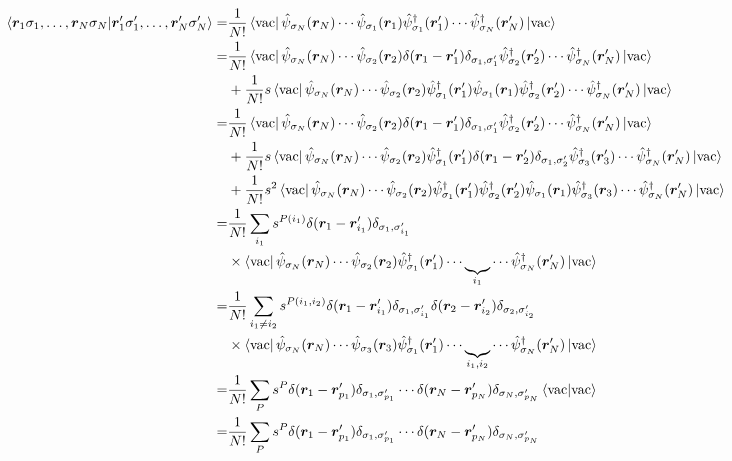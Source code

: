 \documentclass{ltjsarticle}
\begin{document}
\begin{align}
  \braket{\bm{r}_1\sigma_1,\dots,\bm{r}_N\sigma_N}{\bm{r}'_1\sigma'_1,\dots,\bm{r}'_{N}\sigma'_{N}}
  =&\frac{1}{N!} \bra{\rm{vac}}\hat{\psi}_{\sigma_N}(\bm{r}_N)\cdots\hat{\psi}_{\sigma_1}(\bm{r}_1)\hat{\psi}_{\sigma_1}^\dag (\bm{r}'_1)\cdots\hat{\psi}_{\sigma_N}^\dag (\bm{r}'_N)\ket{\rm{vac}}\\
  =&\frac{1}{N!}\bra{\rm{vac}}\hat{\psi}_{\sigma_N}(\bm{r}_N)\cdots\hat{\psi}_{\sigma_2}(\bm{r}_2)\delta(\bm{r}_1-\bm{r}'_{1})\delta_{\sigma_1,\sigma'_{1}}\hat{\psi}_{\sigma_2}^\dag (\bm{r}'_2)\cdots\hat{\psi}_{\sigma_N}^\dag (\bm{r}'_N)\ket{\rm{vac}}\\
  &+\frac{1}{N!}s\bra{\rm{vac}}\hat{\psi}_{\sigma_N}(\bm{r}_N)\cdots\hat{\psi}_{\sigma_2}(\bm{r}_2)\hat{\psi}_{\sigma_1}^\dag (\bm{r}'_1)\hat{\psi}_{\sigma_1}(\bm{r}_1)\hat{\psi}_{\sigma_2}^\dag (\bm{r}'_2)\cdots\hat{\psi}_{\sigma_N}^\dag (\bm{r}'_N)\ket{\rm{vac}}\\
  =&\frac{1}{N!}\bra{\rm{vac}}\hat{\psi}_{\sigma_N}(\bm{r}_N)\cdots\hat{\psi}_{\sigma_2}(\bm{r}_2)\delta(\bm{r}_1-\bm{r}'_{1})\delta_{\sigma_1,\sigma'_{1}}\hat{\psi}_{\sigma_2}^\dag (\bm{r}'_2)\cdots\hat{\psi}_{\sigma_N}^\dag (\bm{r}'_N)\ket{\rm{vac}}\\
  &+\frac{1}{N!}s\bra{\rm{vac}}\hat{\psi}_{\sigma_N}(\bm{r}_N)\cdots\hat{\psi}_{\sigma_2}(\bm{r}_2)\hat{\psi}_{\sigma_1}^\dag (\bm{r}'_1)\delta(\bm{r}_1-\bm{r}'_{2})\delta_{\sigma_1,\sigma'_{2}}\hat{\psi}_{\sigma_3}^\dag (\bm{r}'_3)\cdots\hat{\psi}_{\sigma_N}^\dag (\bm{r}'_N)\ket{\rm{vac}}\\
  &+\frac{1}{N!}s^2\bra{\rm{vac}}\hat{\psi}_{\sigma_N}(\bm{r}_N)\cdots\hat{\psi}_{\sigma_2}(\bm{r}_2)\hat{\psi}_{\sigma_1}^\dag (\bm{r}'_1)\hat{\psi}_{\sigma_2}^\dag (\bm{r}'_2)\hat{\psi}_{\sigma_1}(\bm{r}_1)\hat{\psi}^\dag_{\sigma_3}(\bm{r}_3)\cdots\hat{\psi}_{\sigma_N}^\dag (\bm{r}'_N)\ket{\rm{vac}}\\
  =&\frac{1}{N!}\sum_{i_1}s^{P(i_1)}\delta(\bm{r}_1-\bm{r}'_{i_1})\delta_{\sigma_1,\sigma'_{i_1}}\\
  &\times\bra{\rm{vac}}\hat{\psi}_{\sigma_N}(\bm{r}_N)\cdots\hat{\psi}_{\sigma_2}(\bm{r}_2)\hat{\psi}_{\sigma_1}^\dag (\bm{r}'_1)\cdots\underbrace{}_{i_1}\cdots\hat{\psi}_{\sigma_N}^\dag (\bm{r}'_N)\ket{\rm{vac}}\\
  =&\frac{1}{N!}\sum_{i_1\neq i_2}s^{P(i_1,i_2)}\delta(\bm{r}_1-\bm{r}'_{i_1})\delta_{\sigma_1,\sigma'_{i_1}}\delta(\bm{r}_2-\bm{r}'_{i_2})\delta_{\sigma_2,\sigma'_{i_2}}\\
  &\times\bra{\rm{vac}}\hat{\psi}_{\sigma_N}(\bm{r}_N)\cdots\hat{\psi}_{\sigma_3}(\bm{r}_3)\hat{\psi}_{\sigma_1}^\dag (\bm{r}'_1)\cdots\underbrace{}_{i_1,i_2}\cdots\hat{\psi}_{\sigma_N}^\dag (\bm{r}'_N)\ket{\rm{vac}}\\
  =&\frac{1}{N!}\sum_P s^P\delta(\bm{r}_1-\bm{r}'_{p_1})\delta_{\sigma_1,\sigma'_{p_1}}\cdots\delta(\bm{r}_N-\bm{r}'_{p_N})\delta_{\sigma_N,\sigma'_{p_N}}\braket{\rm{vac}}{\rm{vac}}\\
  =&\frac{1}{N!}\sum_P s^P\delta(\bm{r}_1-\bm{r}'_{p_1})\delta_{\sigma_1,\sigma'_{p_1}}\cdots\delta(\bm{r}_N-\bm{r}'_{p_N})\delta_{\sigma_N,\sigma'_{p_N}}
\end{align}
\end{document}
